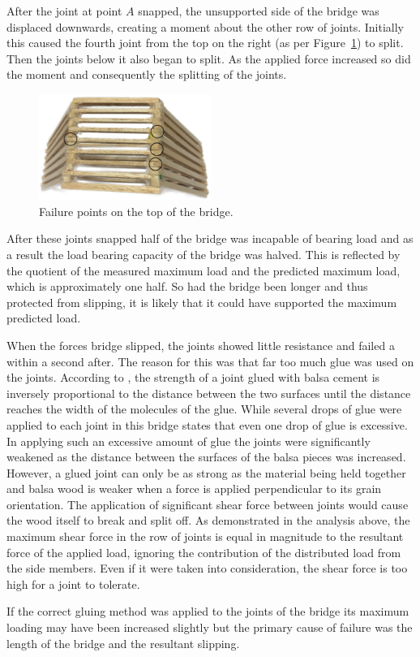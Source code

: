 \documentclass[12pt]{article}
\begin{document}
After the joint at point $A$ snapped, the unsupported side of the bridge was displaced downwards, creating a moment about the other row of joints. Initially this caused the fourth joint from the top on the right (as per Figure~\ref{failtop}) to split. Then the joints below it also began to split. As the applied force increased so did the moment and consequently the splitting of the joints.
		\begin{figure}[h!]
			\centering
			\includegraphics[width=0.5\textwidth]{failtop}
			\caption{Failure points on the top of the bridge.}
			\label{failtop}
		\end{figure}

After these joints snapped half of the bridge was incapable of bearing load and as a result the load bearing capacity of the bridge was halved. This is reflected by the quotient of the measured maximum load and the predicted maximum load, which is approximately one half. So had the bridge been longer and thus protected from slipping, it is likely that it could have supported the maximum predicted load.

When the forces bridge slipped, the joints showed little resistance and failed a within a second after. The reason for this was that far too much glue was used on the joints. According to \cite{glue}, the strength of a joint glued with balsa cement is inversely proportional to the distance between the two surfaces until the distance reaches the width of the molecules of the glue. While several drops of glue were applied to each joint in this bridge \citep{glue} states that even one drop of glue is excessive. In applying such an excessive amount of glue the joints were significantly weakened as the distance between the surfaces of the balsa pieces was increased. However, a glued joint can only be as strong as the material being held together and balsa wood is weaker when a force is applied perpendicular to its grain orientation. The application of significant shear force between joints would cause the wood itself to break and split off. As demonstrated in the analysis above, the maximum shear force in the row of joints is equal in magnitude to the resultant force of the applied load, ignoring the contribution of the distributed load from the side members. Even if it were taken into consideration, the shear force is too high for a joint to tolerate.

If the correct gluing method was applied to the joints of the bridge its maximum loading may have been increased slightly but the primary cause of failure was the length of the bridge and the resultant slipping.
	
\end{document}
